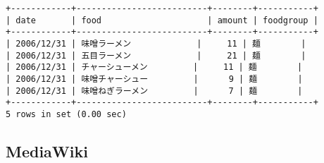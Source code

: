 \documentclass{jlreq}
\begin{document}
\begin{enumerate}
\begin{lstlisting}
+------------+--------------------------+--------+-----------+
| date       | food                     | amount | foodgroup |
+------------+--------------------------+--------+-----------+
| 2006/12/31 | 味噌ラーメン             |     11 | 麺        |
| 2006/12/31 | 五目ラーメン             |     21 | 麺        |
| 2006/12/31 | チャーシューメン         |     11 | 麺        |
| 2006/12/31 | 味噌チャーシュー         |      9 | 麺        |
| 2006/12/31 | 味噌ねぎラーメン         |      7 | 麺        |
+------------+--------------------------+--------+-----------+
5 rows in set (0.00 sec)
\end{lstlisting}
\end{enumerate}
\subsection{MediaWiki}
\end{document}
